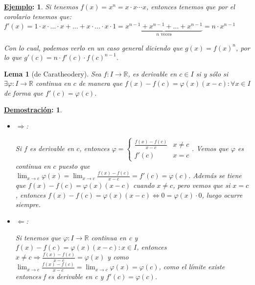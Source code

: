 \documentclass[10pt,a4paper,openright]{book}
\theoremstyle{break}
\newtheorem*{lema}{Lema}
\newtheorem*{demo}{\underline{Demostración}:}
\newtheorem*{ej}{\underline{Ejemplo}:}
\begin{document}
\begin{ej}
Si tenemos $f(x)=x^n= x\cdot x\cdots x$, entonces tenemos que por el corolario tenemos que: $f'(x)=1\cdot x \cdot ... \cdot x + ... + x\cdot ... \cdot x \cdot 1 = \underbrace{x^{n-1} + x^{n-1}+ ... + x^{n-1}}_{n \mbox{ veces}}= n\cdot x^{n-1}$

Con lo cual, podemos verlo en un caso general diciendo que $g(x)= f(x)^n$, por lo que $g'(c)= n\cdot f'(c)\cdot f(c)^{n-1}$.
\end{ej}

\begin{lema}[de Caratheodery]
Sea $f:I \rightarrow \mathbb R$, es derivable en $c\in I$ si y sólo si $\exists\varphi: I\rightarrow \mathbb R$ continua en $c$ de manera que $f(x)-f(c)=\varphi(x)(x-c): \forall x \in I$ de forma que $f'(c)=\varphi(c)$.
\end{lema}
\begin{demo}
\begin{itemize}
\item $\Rightarrow$:

Si $f$ es derivable en $c$, entonces $\varphi=\begin{cases} \frac{f(x)-f(c)}{x-c} & x\neq c \\ f'(c) & x=c\end{cases}$. Vemos que $\varphi$ es continua en $c$ puesto que $\lim_{x\rightarrow c}\varphi(x) = \lim_{x\rightarrow c} \frac{f(x)-f(c)}{x-c}=f'(c)=\varphi(c)$. Además se tiene que $f(x)-f(c)=\varphi(x)(x-c)$ cuando $x\neq c$, pero vemos que si $x=c$, entonces $f(x)-f(c)=\varphi(x)(x-c)\Leftrightarrow 0=\varphi(x)\cdot 0$, luego ocurre siempre.

\item $\Leftarrow$:

Si tenemos que $\varphi: I \rightarrow \mathbb R$ continua en c y $f(x)-f(c)=\varphi(x)(x-c) : x\in I$, entonces $x\neq c\Rightarrow \frac{f(x)-f(c)}{x-c}=\varphi(x)$ y como $\lim_{x\rightarrow c}\frac{f(x)-f(c)}{x-c} = \lim_{x\rightarrow c} \varphi(x)=\varphi(c)$, como el límite existe entonces f es derivable en c y $f'(c)=\varphi(c)$.
\end{itemize}
\end{demo}
\end{document}
